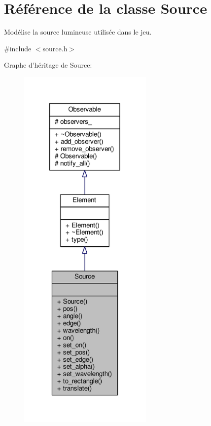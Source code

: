 \hypertarget{classSource}{\section{Référence de la classe Source}
\label{classSource}
}


Modélise la source lumineuse utilisée dans le jeu.  




{\ttfamily \#include $<$source.\+h$>$}



Graphe d'héritage de Source\+:\nopagebreak
\begin{figure}[H]
\begin{center}
\leavevmode
\includegraphics[width=186pt]{da/d95/classSource__inherit__graph}
\end{center}
\end{figure}


